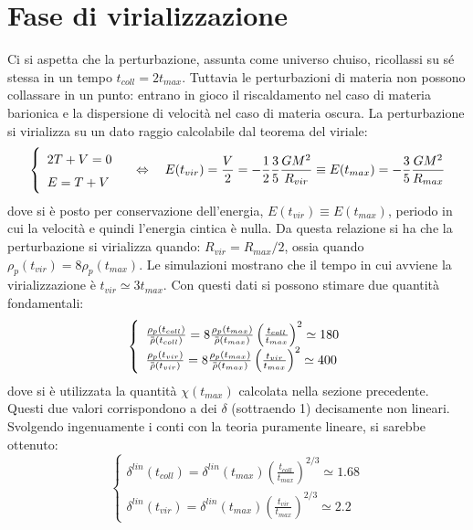 \section{Fase di virializzazione}
Ci si aspetta che la perturbazione, assunta come universo chuiso, ricollassi su sé stessa in un tempo $t_{coll}=2t_{max}$. Tuttavia le perturbazioni di materia non possono collassare in un punto: entrano in gioco il riscaldamento nel caso di materia barionica e la dispersione di velocità nel caso di materia oscura. La perturbazione si virializza su un dato raggio calcolabile dal teorema del viriale:
\begin{equation*}\left\{
    \def\arraystretch{1.5}
        \begin{array}{ll}
            2T+V=0 \\
            E=T+V
    \end{array}\right. \quad\Leftrightarrow  \quad E(t_{vir})=\frac{V}{2}= -\frac{1}{2}\frac{3}{5}\frac{G M^2}{R_{vir}}\equiv E(t_{max})=-\frac{3}{5}\frac{GM^2}{R_{max}}
\end{equation*}
dove si è posto per conservazione dell'energia, $E(t_{vir})\equiv E(t_{max})$, periodo in cui la velocità e quindi l'energia cintica è nulla. Da questa relazione si ha che la perturbazione si virializza quando: $R_{vir}=R_{max}/2$, ossia quando $\rho_p (t_{vir})=8 \rho_p (t_{max})$. Le simulazioni mostrano che il tempo in cui avviene la virializzazione è $t_{vir}\simeq 3 t_{max}$. Con questi dati si possono stimare due quantità fondamentali:
\begin{equation}\left\{
    \def\arraystretch{1.5}
        \begin{array}{ll}
        \frac{\rho_p (t_{coll})}{\overbar{\rho}(t_{coll})}=8 \frac{\rho_p (t_{max})}{\overbar{\rho}(t_{max})}\left(\frac{t_{coll}}{t_{max}}\right)^2 \simeq 180\\
        \frac{\rho_p (t_{vir})}{\overbar{\rho}(t_{vir})}=8 \frac{\rho_p (t_{max})}{\overbar{\rho}(t_{max})}\left(\frac{t_{vir}}{t_{max}}\right)^2 \simeq 400
    \end{array}\right. 
\end{equation}
dove si è utilizzata la quantità $\chi (t_{max})$ calcolata nella sezione precedente. Questi due valori corrispondono a dei $\delta$ (sottraendo 1) decisamente non lineari. Svolgendo ingenuamente i conti con la teoria puramente lineare, si sarebbe ottenuto:
\begin{equation}\left\{
    \begin{array}{l}
    \delta^{lin}(t_{coll})=\delta^{lin}(t_{max})\left(\frac{t_{coll}}{t_{max}}\right)^{2/3}\simeq 1.68\\
    \delta^{lin}(t_{vir})=\delta^{lin}(t_{max})\left(\frac{t_{vir}}{t_{max}}\right)^{2/3}\simeq 2.2
\end{array}\right. 
\end{equation}

